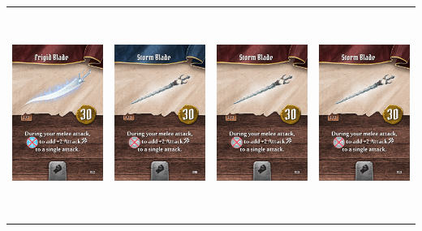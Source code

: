 \documentclass{minimal}
\begin{document}
{\begin{longtable}{llll}
\includegraphics[width=44mm,height=68mm]{./64-151/gh-077b-frigid-blade.png} &
\includegraphics[width=44mm,height=68mm]{./64-151/gh-078a-storm-blade.png} &
\includegraphics[width=44mm,height=68mm]{./64-151/gh-078b-storm-blade.png} &
\includegraphics[width=44mm,height=68mm]{./64-151/gh-078b-storm-blade.png}\\ 

\end{longtable}}
\end{document}
